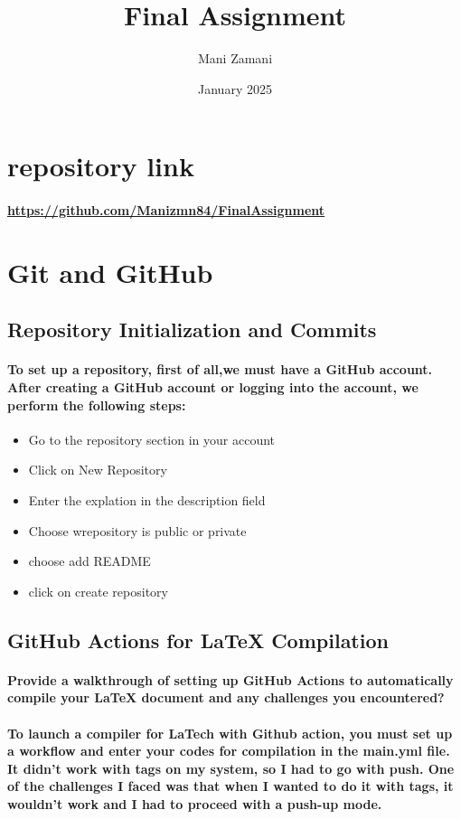 \documentclass[12pt]{article}
\title{Final Assignment}
\author{Mani Zamani}
\date{January 2025}
\begin{document}
\maketitle
\newpage
\tableofcontents
\newpage

\section{repository link}
\paragraph{\url{https://github.com/Manizmn84/FinalAssignment}}


\section{Git and GitHub}
\subsection{Repository Initialization and Commits}

\paragraph{To set up a repository, first of all,we must have a GitHub account. After creating a GitHub account or logging into the account, we perform the following steps:}

\begin{itemize}
    \item Go to the repository section in your account
    \item Click on New Repository
    \item Enter the explation in the description field
    \item Choose wrepository is public or private
    \item choose add README
    \item click on create repository 
\end{itemize}
\subsection{GitHub Actions for LaTeX Compilation}
\paragraph{Provide a walkthrough of setting up GitHub Actions to automatically compile your LaTeX
document and any challenges you encountered?}
\paragraph{To launch a compiler for LaTech with Github action, you must set up a workflow and enter your codes for compilation in the main.yml file.\\ It didn't work with tags on my system, so I had to go with push.
One of the challenges I faced was that when I wanted to do it with tags, it wouldn't work and I had to proceed with a push-up mode.}
\end{document}
